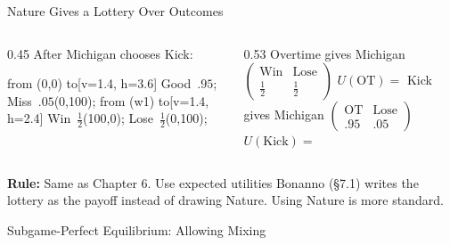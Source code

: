 \begin{frame}{Nature Gives a Lottery Over Outcomes}
\begin{columns}[T]
\begin{column}{0.45\textwidth}
\centering
After Michigan chooses Kick:
\bsk
\begin{gametree}[player names={Michigan, OSU}, scale=0.85]
  \branch[player=0, root=w, label=90] from (0,0) to[v=1.4, h=3.6] {Good\ $.95$; Miss\ $.05$(0,100)};
  \branch[player=0, label=150, label text=OT] from (w1) to[v=1.4, h=2.4] {Win\ $\frac12$(100,0); Lose\ $\frac12$(0,100)};
\end{gametree}
\end{column}
\begin{column}{0.53\textwidth}
Overtime gives Michigan
$\begin{pmatrix} \text{Win} & \text{Lose} \\ \tfrac12 & \tfrac12\end{pmatrix}$
\bsk
$U(\text{OT})=$ \underline{\hspace{1in}}
\bsk
Kick gives Michigan
$\begin{pmatrix} \text{OT} & \text{Lose} \\ .95 & .05\end{pmatrix}$
\bsk
$U(\text{Kick})=$ \underline{\hspace{1in}}
\end{column}
\end{columns}
\bsk
\textbf{Rule:} Same as Chapter 6. Use expected utilities
\bsk
{}
\vfill
{\footnotesize Bonanno (\S7.1) writes the lottery as the payoff instead of drawing Nature. Using Nature is more standard.}
\vspace{-0.2in}
\end{frame}


\begin{frame}[standout]
Subgame-Perfect Equilibrium: Allowing Mixing
\end{frame}

